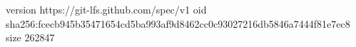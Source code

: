version https://git-lfs.github.com/spec/v1
oid sha256:fcecb945b35471654cd5ba993af9d8462cc0c93027216db5846a7444f81e7ec8
size 262847
